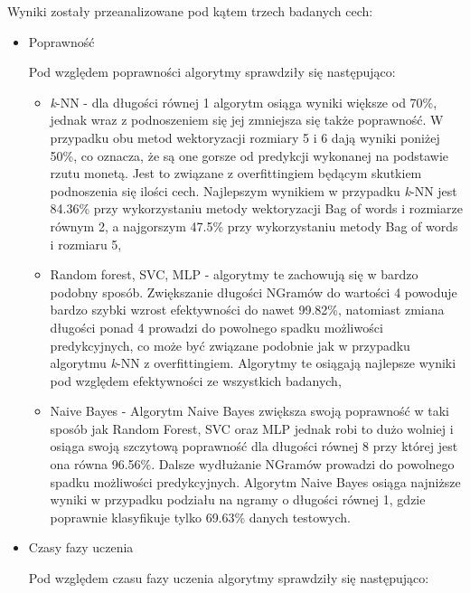 Wyniki zostały przeanalizowane pod kątem trzech badanych cech:

\begin{itemize}
    \item Poprawność
    
    Pod względem poprawności algorytmy sprawdziły się następująco:
    \begin{itemize}
        \item \textit{k}-NN -
        dla długości równej 1 algorytm osiąga wyniki większe od 70\%, jednak wraz 
        z podnoszeniem się jej zmniejsza się także poprawność. W przypadku obu metod 
        wektoryzacji rozmiary 5 i 6 dają wyniki poniżej 50\%, co oznacza, że są one gorsze 
        od predykcji wykonanej na podstawie rzutu monetą. Jest to związane 
        z overfittingiem będącym skutkiem podnoszenia się ilości cech. Najlepszym wynikiem w 
        przypadku \textit{k}-NN jest 84.36\% przy wykorzystaniu metody wektoryzacji Bag of words i rozmiarze równym 2,
        a najgorszym 47.5\%  przy wykorzystaniu metody Bag of words i rozmiaru 5,

        \item Random forest, SVC, MLP -        
        algorytmy te zachowują się w bardzo podobny sposób. Zwiększanie długości NGramów 
        do wartości 4 powoduje bardzo szybki wzrost efektywności do nawet 99.82\%, natomiast zmiana 
        długości ponad 4 prowadzi do powolnego spadku możliwości predykcyjnych, co może być 
        związane podobnie jak w przypadku algorytmu \textit{k}-NN z overfittingiem. Algorytmy te osiągają najlepsze 
        wyniki pod względem efektywności ze wszystkich badanych,
        \item Naive Bayes -
        Algorytm Naive Bayes zwiększa swoją poprawność w taki sposób jak Random Forest, SVC oraz MLP 
        jednak robi to dużo wolniej i osiąga swoją szczytową poprawność dla długości równej 8 przy której 
        jest ona równa 96.56\%. Dalsze wydłużanie NGramów prowadzi do powolnego spadku możliwości predykcyjnych.
        Algorytm Naive Bayes osiąga najniższe wyniki w przypadku podziału na ngramy o długości równej 1, gdzie 
        poprawnie klasyfikuje tylko 69.63\% danych testowych.
    \end{itemize}
    \item Czasy fazy uczenia
    
    Pod względem czasu fazy uczenia algorytmy sprawdziły się następująco:
    

\end{itemize}
